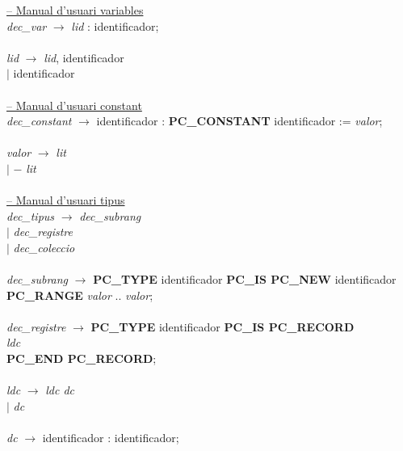 \begin{tabbing}
        \underline{-- Manual d'usuari variables} \\
        \textit{dec\_var} \> $\rightarrow$ \> \textit{lid} : identificador; \\
        \\
        \textit{lid} \> $\rightarrow$ \> \textit{lid}, identificador \\
        \> $\mid$ \> identificador \\
        \\
        
        \underline{-- Manual d'usuari constant} \\
        \textit{dec\_constant} \> $\rightarrow$ \> identificador : \textbf{PC\_CONSTANT} identificador := \textit{valor};  \\
        \\
        \textit{valor} \> $\rightarrow$ \> \textit{lit} \\
        \> $\mid$ \> $-$ \textit{lit} \\
        \\
        
        \underline{-- Manual d'usuari tipus} \\
        \textit{dec\_tipus} \> $\rightarrow$ \> \textit{dec\_subrang}  \\
        \> $\mid$ \> \textit{dec\_registre} \\
        \> $\mid$ \> \textit{dec\_coleccio} \\
        \\
        \textit{dec\_subrang} \> $\rightarrow$ \> \textbf{PC\_TYPE} identificador \textbf{PC\_IS PC\_NEW} identificador\\
		\> \> \textbf{PC\_RANGE} \textit{valor} .. \textit{valor}; \\
        \\
        \textit{dec\_registre} \> $\rightarrow$ \> \textbf{PC\_TYPE} identificador \textbf{PC\_IS PC\_RECORD} \\
        \> \> \> \textit{ldc} \\
        \> \> \textbf{PC\_END PC\_RECORD}; \\
        \\
        \textit{ldc} \> $\rightarrow$ \> \textit{ldc dc} \\
        \> $\mid$ \> \textit{dc} \\
        \\
        \textit{dc} \> $\rightarrow$ \> identificador : identificador; \\
        \\
        

\end{tabbing}
